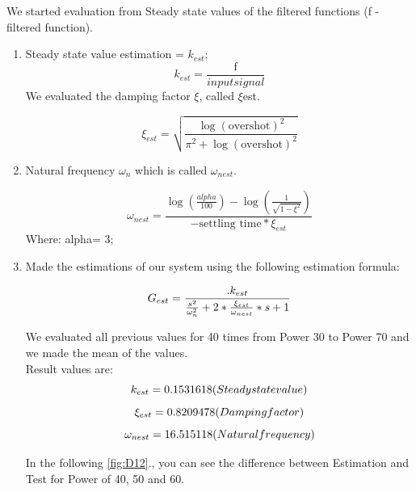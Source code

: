 \documentclass[a4paper,12pt,oneside]{article}
\begin{document}
We started evaluation from Steady state values of the filtered functions (f - filtered function).

\begin{enumerate}
\item Steady state value estimation = $k_{est}$;
\begin{equation}
k_{est} = \frac{\text{f}}{{input signal }}
\end{equation}
We evaluated the damping factor $\xi$, called $\xi${est}.

\begin{equation}
\xi_{est} = \sqrt{\frac{\log(\text{overshot}) ^ 2}{\pi ^ 2 + \log(\text{overshot}) ^ 2}}
\end{equation}


\item Natural frequency $\omega_{n}$ which is called  $\omega_{nest}$.

\begin{equation}
\omega_{nest} =  \frac{\log(\frac{alpha}{100}) -\log(\frac{1}{\sqrt{1-\xi^2}})}{-\text{settling time} * \xi_{est}}
\end{equation}
Where: alpha= 3;


\item Made the estimations of our system using the following estimation formula:

\begin{equation}
G_{est} =  \frac {\text .{k_{est}}} {\frac{s^2}{\omega_{n}^2} + 2* {\frac {\xi_{est}}{\omega_{nest}}*s+1}}
\end{equation}

We evaluated all previous values for 40 times from Power 30 to Power 70 and we made the mean of the values.\\ [5 mm]
Result values are: \\ [5 mm]
\begin{equation} 
k_{est} = 0.1531618 (Steady state value) \\
\end{equation}
\begin{equation}
\xi_{est}= 0.8209478 (Damping factor) \\
\end{equation}
\begin{equation}
\omega_{nest}= 16.515118 (Natural frequency) \\ 
\end{equation}


In the following \cref{fig:D12}., you can see the difference between Estimation and Test for Power of 40, 50 and 60.


\end{enumerate}
\end{document}

